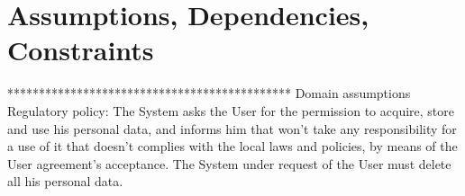\section{Assumptions, Dependencies, Constraints}
********************************************* Domain assumptions
\\
Regulatory policy:
The System asks the User for the permission to acquire, store and use his personal data, and informs him that won't take any responsibility for a use of it that doesn't complies with the local laws and policies, by means of the User agreement's acceptance.
The System under request of the User must delete all his personal data.
%
